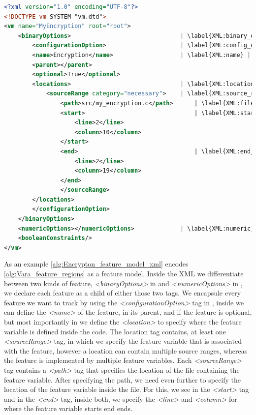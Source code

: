 \begin{minipage}{\linewidth}
\begin{lstlisting}[caption={Feature model of \autoref{alg:Vara_feature_regions} in XML},language=XML,label={alg:Encrypton_feature_model_xml},escapechar=|]
<?xml version="1.0" encoding="UTF-8"?>
<!DOCTYPE vm SYSTEM "vm.dtd">
<vm name="MyEncryption" root="root">
    <binaryOptions>                               | \label{XML:binary_option} |
        <configurationOption>                     | \label{XML:config_option} |
        <name>Encryption</name>                   | \label{XML:name} |
        <parent></parent>
        <optional>True</optional>
        <locations>                               | \label{XML:location} |
            <sourceRange category="necessary">    | \label{XML:source_range} |
                <path>src/my_encryption.c</path>      | \label{XML:file_path} |
                <start>                               | \label{XML:start_variable} |
                    <line>2</line>
                    <column>10</column>
                </start>
                <end>                                 | \label{XML:end_variable} |
                    <line>2</line>
                    <column>19</column>
                </end>
                </sourceRange>
        </locations>
        </configurationOption>
    </binaryOptions>
    <numericOptions></numericOptions>             | \label{XML:numeric_option} |
    <booleanConstraints/>
</vm>
\end{lstlisting}
\end{minipage}

As an example \autoref{alg:Encrypton_feature_model_xml} encodes \autoref{alg:Vara_feature_regions} as a feature model. 
Inside the \textsc{XML} we differentiate between two kinds of feature, \emph{<binaryOptions>} in  and \emph{<numericOptions>} in 
, we declare each feature as a child of either those two tags. We encapsule every feature we want to 
track by using the \emph{<configurationOption>} tag in , inside we can define the \emph{<name>} of the feature, in 
its parent, and if the feature is optional, but most importantly in  we define the \emph{<location>} to specify
where the feature variable is defined inside the code.
The location tag contains, at least one \emph{<sourceRange>} tag, in which we specify the feature variable that is associated with the feature, 
however a location can contain multiple source ranges, whereas the feature is implemented by multiple feature variables.
Each \emph{<sourceRange>} tag contains a \emph{<path>} tag that specifies the location of the file containing the feature variable.
After specifying the path, we need even further to specify the location of the feature variable inside the file. 
For this, we see in  the \emph{<start>} tag and in  the \emph{<end>} tag, 
inside both, we specify the \emph{<line>} and \emph{<column>} for where the feature variable starts end ends. 

